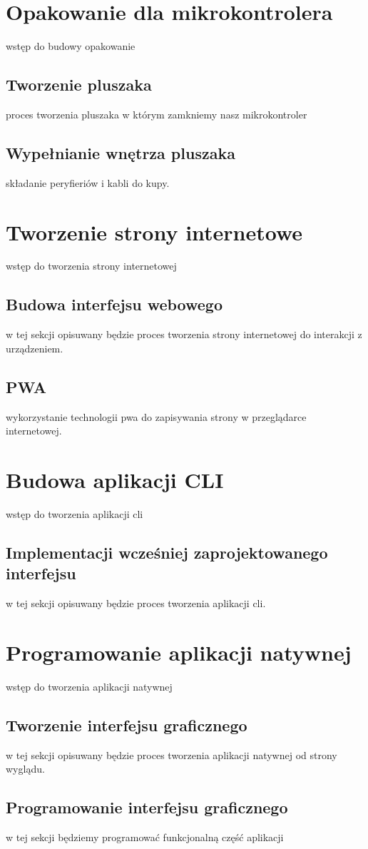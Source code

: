 \documentclass[a4paper,12pt,oneside,onecolumn]{book}
\begin{document}
\chapter{Opakowanie dla mikrokontrolera}
wstęp do budowy opakowanie
\section{Tworzenie pluszaka}
proces tworzenia pluszaka w którym zamkniemy nasz mikrokontroler
\section{Wypełnianie wnętrza pluszaka}
składanie peryfieriów i kabli do kupy.
\chapter{Tworzenie strony internetowe}
wstęp do tworzenia strony internetowej
\section{Budowa interfejsu webowego}
w tej sekcji opisuwany będzie proces tworzenia strony internetowej do interakcji z urządzeniem.
\section{PWA}
wykorzystanie technologii pwa do zapisywania strony w przeglądarce internetowej.
\chapter{Budowa aplikacji CLI}
wstęp do tworzenia aplikacji cli
\section{Implementacji wcześniej zaprojektowanego interfejsu}
w tej sekcji opisuwany będzie proces tworzenia aplikacji cli.
\chapter{Programowanie aplikacji natywnej}
wstęp do tworzenia aplikacji natywnej
\section{Tworzenie interfejsu graficznego}
w tej sekcji opisuwany będzie proces tworzenia aplikacji natywnej od strony wyglądu.
\section{Programowanie interfejsu graficznego}
w tej sekcji będziemy programować funkcjonalną część aplikacji
\end{document}

